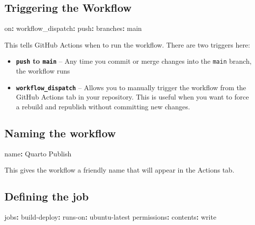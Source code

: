 \documentclass[
  letterpaper,
  DIV=11,
  numbers=noendperiod]{scrreprt}
\newenvironment{Shaded}{\begin{snugshade}}{\end{snugshade}}
\newcommand{\AttributeTok}[1]{\textcolor[rgb]{0.40,0.45,0.13}{#1}}
\newcommand{\FunctionTok}[1]{\textcolor[rgb]{0.28,0.35,0.67}{#1}}
\newcommand{\KeywordTok}[1]{\textcolor[rgb]{0.00,0.23,0.31}{\textbf{#1}}}
\begin{document}
\subsection{Triggering the Workflow}\label{triggering-the-workflow}

\begin{Shaded}
\begin{Highlighting}[]
\FunctionTok{on}\KeywordTok{:}
\AttributeTok{  }\FunctionTok{workflow\_dispatch}\KeywordTok{:}
\AttributeTok{  }\FunctionTok{push}\KeywordTok{:}
\AttributeTok{    }\FunctionTok{branches}\KeywordTok{:}\AttributeTok{ main}
\end{Highlighting}
\end{Shaded}

This tells GitHub Actions when to run the workflow. There are two
triggers here:

\begin{itemize}
\item
  \textbf{\texttt{push} to \texttt{main}} -- Any time you commit or
  merge changes into the \texttt{main} branch, the workflow runs
\item
  \textbf{\texttt{workflow\_dispatch}} -- Allows you to manually trigger
  the workflow from the GitHub Actions tab in your repository. This is
  useful when you want to force a rebuild and republish without
  committing new changes.
\end{itemize}

\subsection{Naming the workflow}\label{naming-the-workflow}

\begin{Shaded}
\begin{Highlighting}[]
\FunctionTok{name}\KeywordTok{:}\AttributeTok{ Quarto Publish}
\end{Highlighting}
\end{Shaded}

This gives the workflow a friendly name that will appear in the Actions
tab.

\subsection{Defining the job}\label{defining-the-job}

\begin{Shaded}
\begin{Highlighting}[]
\FunctionTok{jobs}\KeywordTok{:}
\AttributeTok{  }\FunctionTok{build{-}deploy}\KeywordTok{:}
\AttributeTok{    }\FunctionTok{runs{-}on}\KeywordTok{:}\AttributeTok{ ubuntu{-}latest}
\AttributeTok{    }\FunctionTok{permissions}\KeywordTok{:}
\AttributeTok{      }\FunctionTok{contents}\KeywordTok{:}\AttributeTok{ write}
\end{Highlighting}
\end{Shaded}
\end{document}
